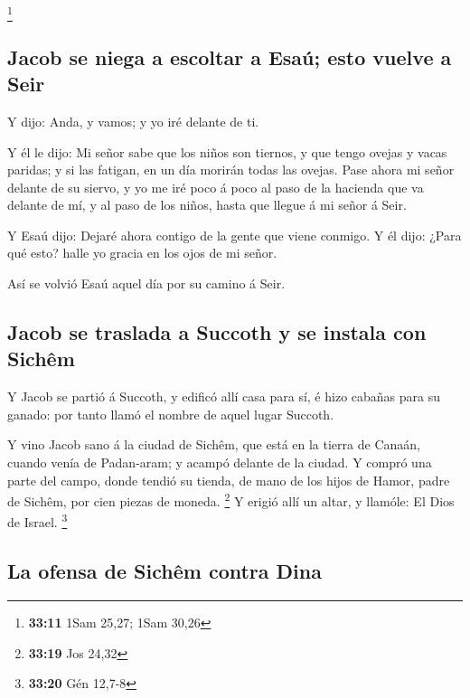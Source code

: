 \footnote{\textbf{33:11} 1Sam 25,27; 1Sam 30,26}

\hypertarget{jacob-se-niega-a-escoltar-a-esauxfa-esto-vuelve-a-seir}{%
\subsection{Jacob se niega a escoltar a Esaú; esto vuelve a
Seir}\label{jacob-se-niega-a-escoltar-a-esauxfa-esto-vuelve-a-seir}}

 Y dijo: Anda, y vamos; y yo iré delante de ti.

 Y él le dijo: Mi señor sabe que los niños son tiernos, y
que tengo ovejas y vacas paridas; y si las fatigan, en un día morirán
todas las ovejas.  Pase ahora mi señor delante de su
siervo, y yo me iré poco á poco al paso de la hacienda que va delante de
mí, y al paso de los niños, hasta que llegue á mi señor á Seir.

 Y Esaú dijo: Dejaré ahora contigo de la gente que viene
conmigo. Y él dijo: ¿Para qué esto? halle yo gracia en los ojos de mi
señor.

 Así se volvió Esaú aquel día por su camino á Seir.

\hypertarget{jacob-se-traslada-a-succoth-y-se-instala-con-sichuxeam}{%
\subsection{Jacob se traslada a Succoth y se instala con
Sichêm}\label{jacob-se-traslada-a-succoth-y-se-instala-con-sichuxeam}}

 Y Jacob se partió á Succoth, y edificó allí casa para sí,
é hizo cabañas para su ganado: por tanto llamó el nombre de aquel lugar
Succoth.

 Y vino Jacob sano á la ciudad de Sichêm, que está en la
tierra de Canaán, cuando venía de Padan-aram; y acampó delante de la
ciudad.  Y compró una parte del campo, donde tendió su
tienda, de mano de los hijos de Hamor, padre de Sichêm, por cien piezas
de moneda. \footnote{\textbf{33:19} Jos 24,32}  Y erigió
allí un altar, y llamóle: El Dios de Israel. \footnote{\textbf{33:20}
  Gén 12,7-8}

\hypertarget{la-ofensa-de-sichuxeam-contra-dina}{%
\subsection{La ofensa de Sichêm contra
Dina}\label{la-ofensa-de-sichuxeam-contra-dina}}

